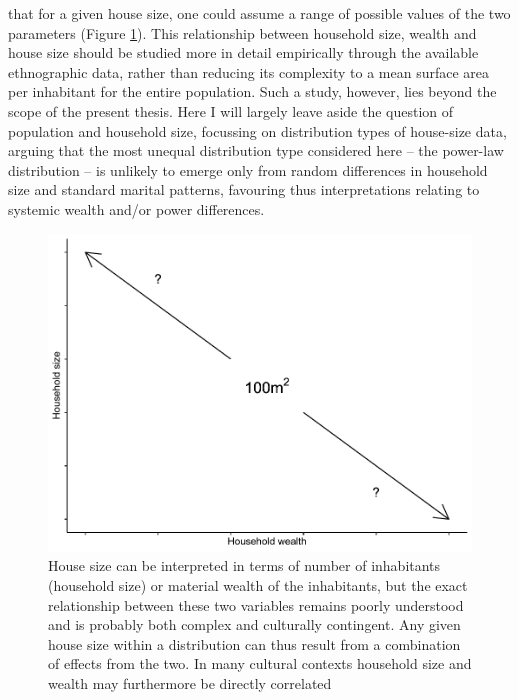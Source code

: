 \documentclass[
  12pt,
]{book}
\begin{document}
that for a given house size, one could assume a range of possible values of the two parameters (Figure \ref{fig:04-intro}). This relationship between household size, wealth and house size should be studied more in detail empirically through the available ethnographic data, rather than reducing its complexity to a mean surface area per inhabitant for the entire population. Such a study, however, lies beyond the scope of the present thesis. Here I will largely leave aside the question of population and household size, focussing on distribution types of house-size data, arguing that the most unequal distribution type considered here -- the power-law distribution -- is unlikely to emerge only from random differences in household size and standard marital patterns, favouring thus interpretations relating to systemic wealth and/or power differences.



\begin{figure}

{\centering \includegraphics[width=0.7\linewidth]{bookdown-demo_files/figure-latex/04-intro-1} 

}

\caption{House size can be interpreted in terms of number of inhabitants (household size) or material wealth of the inhabitants, but the exact relationship between these two variables remains poorly understood and is probably both complex and culturally contingent. Any given house size within a distribution can thus result from a combination of effects from the two. In many cultural contexts household size and wealth may furthermore be directly correlated}\label{fig:04-intro}
\end{figure}
\end{document}
